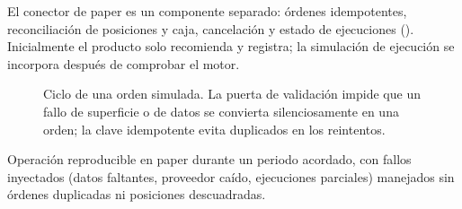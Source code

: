 El conector de paper es un componente separado: órdenes idempotentes, reconciliación de posiciones y caja,
cancelación y estado de ejecuciones (). Inicialmente el producto solo recomienda y
registra; la simulación de ejecución se incorpora después de comprobar el motor.

\begin{figure}[H]
\centering
\resizebox{\linewidth}{!}{}
\caption{Ciclo de una orden simulada. La puerta de validación impide que un fallo de superficie o de datos
se convierta silenciosamente en una orden; la clave idempotente evita duplicados en los reintentos.}
\label{fig:ordenes}
\end{figure}

\begin{criterio}
Operación reproducible en paper durante un periodo acordado, con fallos inyectados (datos faltantes,
proveedor caído, ejecuciones parciales) manejados sin órdenes duplicadas ni posiciones descuadradas.
\end{criterio}
